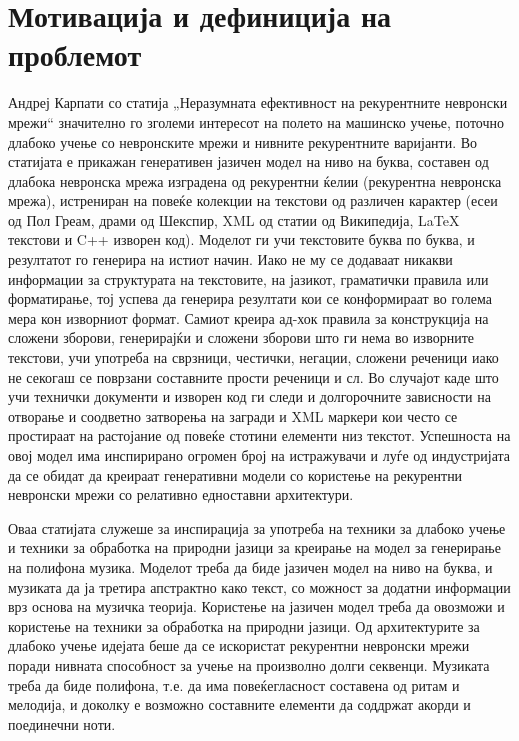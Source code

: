 \chapter{Мотивација и дефиниција на проблемот}
\label{ch:motivacija}

Андреј Карпати со статија „Неразумната ефективност на рекурентните невронски мрежи“ \cite{AndrejKarpathy2015} значително го зголеми интересот на полето на машинско учење, поточно длабоко учење со невронските мрежи и нивните рекурентните варијанти. Во статијата е прикажан генеративен јазичен модел на ниво на буква, составен од длабока невронска мрежа изградена од рекурентни ќелии (рекурентна невронска мрежа), истрениран на повеќе колекции на текстови од различен карактер (есеи од Пол Греам, драми од Шекспир, XML од статии од Википедија, LaTeX текстови и C++ изворен код). Моделот ги учи текстовите буква по буква, и резултатот го генерира на истиот начин. Иако не му се додаваат никакви информации за структурата на текстовите, на јазикот, граматички правила или форматирање, тој успева да генерира резултати кои се конформираат во голема мера кон изворниот формат. Самиот креира ад-хок правила за конструкција на сложени зборови, генерирајќи и сложени зборови што ги нема во изворните текстови, учи употреба на сврзници, честички, негации, сложени реченици иако не секогаш се поврзани составните прости реченици и сл. Во случајот каде што учи технички документи и изворен код ги следи и долгорочните зависности на отворање и соодветно затворења на загради и XML маркери кои често се простираат на растојание од повеќе стотини елементи низ текстот. Успешноста на овој модел има инспирирано огромен број на истражувачи и луѓе од индустријата да се обидат да креираат генеративни модели со користење на рекурентни невронски мрежи со релативно едноставни архитектури. 

Оваа статијата служеше за инспирација за употреба на техники за длабоко учење и техники за обработка на природни јазици за креирање на модел за генерирање на полифона музика. Моделот треба да биде јазичен модел на ниво на буква, и музиката да ја третира апстрактно како текст, со можност за додатни информации врз основа на музичка теорија. Користење на јазичен модел треба да овозможи и користење на техники за обработка на природни јазици. Од архитектурите за длабоко учење идејата беше да се искористат рекурентни невронски мрежи поради нивната способност за учење на произволно долги секвенци. Музиката треба да биде полифона, т.е. да има повеќегласност составена од ритам и мелодија, и доколку е возможно составните елементи да соддржат акорди и поединечни ноти.

